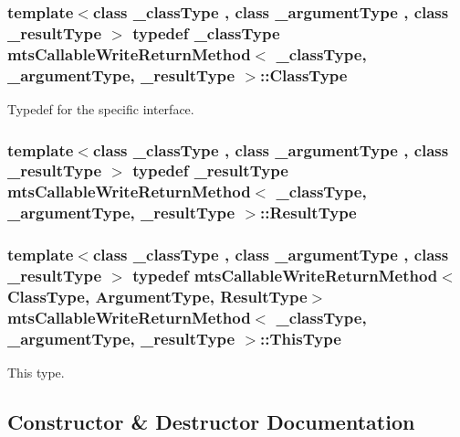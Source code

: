 \subsubsection[{Class\+Type}]{\setlength{\rightskip}{0pt plus 5cm}template$<$class \+\_\+class\+Type , class \+\_\+argument\+Type , class \+\_\+result\+Type $>$ typedef \+\_\+class\+Type {\bf mts\+Callable\+Write\+Return\+Method}$<$ \+\_\+class\+Type, \+\_\+argument\+Type, \+\_\+result\+Type $>$\+::{\bf Class\+Type}}\label{classmts_callable_write_return_method_a51dbe6298941ab172d83182c8188092d}
Typedef for the specific interface. \hypertarget{classmts_callable_write_return_method_aad7815169b189d2f7a0e240ea134fd97}{}
\subsubsection[{Result\+Type}]{\setlength{\rightskip}{0pt plus 5cm}template$<$class \+\_\+class\+Type , class \+\_\+argument\+Type , class \+\_\+result\+Type $>$ typedef \+\_\+result\+Type {\bf mts\+Callable\+Write\+Return\+Method}$<$ \+\_\+class\+Type, \+\_\+argument\+Type, \+\_\+result\+Type $>$\+::{\bf Result\+Type}}\label{classmts_callable_write_return_method_aad7815169b189d2f7a0e240ea134fd97}
\hypertarget{classmts_callable_write_return_method_adc8a7a7a10c5aa9fe1e63b4e667c5d6c}{}
\subsubsection[{This\+Type}]{\setlength{\rightskip}{0pt plus 5cm}template$<$class \+\_\+class\+Type , class \+\_\+argument\+Type , class \+\_\+result\+Type $>$ typedef {\bf mts\+Callable\+Write\+Return\+Method}$<${\bf Class\+Type}, {\bf Argument\+Type}, {\bf Result\+Type}$>$ {\bf mts\+Callable\+Write\+Return\+Method}$<$ \+\_\+class\+Type, \+\_\+argument\+Type, \+\_\+result\+Type $>$\+::{\bf This\+Type}}\label{classmts_callable_write_return_method_adc8a7a7a10c5aa9fe1e63b4e667c5d6c}
This type. 

\subsection{Constructor \& Destructor Documentation}
\hypertarget{classmts_callable_write_return_method_a772c565f1a82229cbf1be0cd257ddd98}{}
